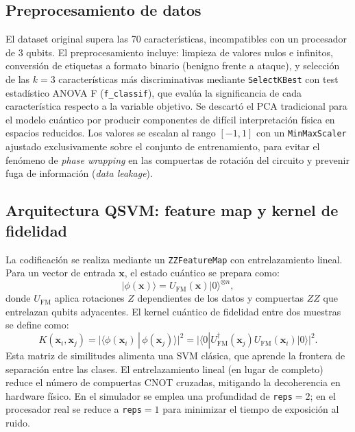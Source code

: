 \documentclass[10pt,conference]{IEEEtran}
\begin{document}
\subsection{Preprocesamiento de datos}
El dataset original supera las 70 características, incompatibles con un
procesador de 3 qubits. El preprocesamiento incluye: limpieza de
valores nulos e infinitos, conversión de etiquetas a formato binario
(benigno frente a ataque), y selección de las $k=3$ características más
discriminativas mediante \texttt{SelectKBest} con test estadístico
ANOVA F (\texttt{f\_classif}), que evalúa la significancia de cada
característica respecto a la variable objetivo. Se descartó el PCA
tradicional para el modelo cuántico por producir componentes de difícil
interpretación física en espacios reducidos. Los valores se escalan al
rango $[-1,1]$ con un \texttt{MinMaxScaler} ajustado exclusivamente
sobre el conjunto de entrenamiento, para evitar el fenómeno de
\textit{phase wrapping} en las compuertas de rotación del circuito y
prevenir fuga de información (\textit{data leakage}).

\subsection{Arquitectura QSVM: feature map y kernel de fidelidad}
La codificación se realiza mediante un \texttt{ZZFeatureMap} con
entrelazamiento lineal. Para un vector de entrada $\mathbf{x}$, el
estado cuántico se prepara como:
\begin{equation}
  |\phi(\mathbf{x})\rangle = U_{\mathrm{FM}}(\mathbf{x})|0\rangle^{\otimes n},
\end{equation}
donde $U_{\mathrm{FM}}$ aplica rotaciones $Z$ dependientes de los datos
y compuertas $ZZ$ que entrelazan qubits adyacentes. El kernel cuántico
de fidelidad entre dos muestras se define como:
\begin{equation}
  K(\mathbf{x}_i,\mathbf{x}_j) =
  \big|\langle \phi(\mathbf{x}_i)\,|\,\phi(\mathbf{x}_j)\rangle\big|^{2}
  = \big|\langle 0|U_{\mathrm{FM}}^\dagger(\mathbf{x}_j)
    U_{\mathrm{FM}}(\mathbf{x}_i)|0\rangle\big|^{2}.
  \label{eq:kernel}
\end{equation}
Esta matriz de similitudes alimenta una SVM clásica, que aprende la
frontera de separación entre las clases. El entrelazamiento lineal (en
lugar de completo) reduce el número de compuertas CNOT cruzadas,
mitigando la decoherencia en hardware físico. En el simulador se emplea
una profundidad de \texttt{reps}$=2$; en el procesador real se reduce a
\texttt{reps}$=1$ para minimizar el tiempo de exposición al ruido.
\end{document}
